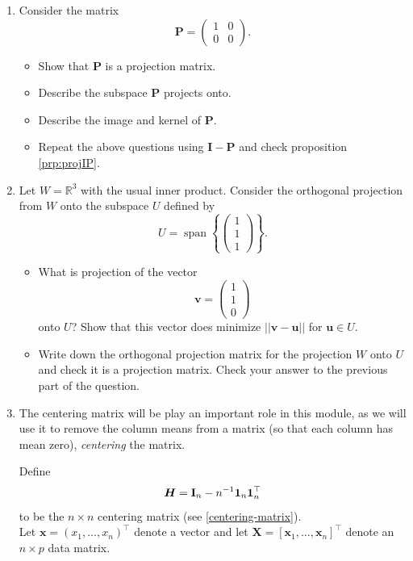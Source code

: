 \documentclass[]{book}
\providecommand{\tightlist}{%
  \setlength{\itemsep}{0pt}\setlength{\parskip}{0pt}}
\theoremstyle{definition}
\theoremstyle{definition}
\theoremstyle{definition}
\theoremstyle{remark}
\begin{document}
\begin{enumerate}
\def\labelenumi{\arabic{enumi}.}
\setcounter{enumi}{5}
\item
  Consider the matrix \[\boldsymbol P=\left( \begin{array}{cc}1&0\\
  0&0\end{array}\right).\]

  \begin{itemize}
  \tightlist
  \item
    Show that \(\boldsymbol P\) is a projection matrix.
  \item
    Describe the subspace \(\boldsymbol P\) projects onto.
  \item
    Describe the image and kernel of \(\boldsymbol P\).
  \item
    Repeat the above questions using \(\mathbf I-\boldsymbol P\) and check proposition \ref{prp:projIP}.
  \end{itemize}
\item
  Let \(W=\mathbb{R}^3\) with the usual inner product.
  Consider the orthogonal projection from \(W\) onto the subspace \(U\) defined by
  \[U=\operatorname{span}\left\{\left(\begin{array}{c} 1\\1\\1\end{array}\right)\right\}.\]

  \begin{itemize}
  \tightlist
  \item
    What is projection of the vector \[\boldsymbol v=\left(\begin{array}{c} 1\\1\\0\end{array}\right)\]
    onto \(U\)? Show that this vector does minimize \(||\boldsymbol v-\boldsymbol u||\) for \(\boldsymbol u\in U\).
  \item
    Write down the orthogonal projection matrix for the projection \(W\) onto \(U\) and check it is a projection matrix. Check your answer to the previous part of the question.
  \end{itemize}
\item
  The centering matrix will be play an important role in this module, as we will use it to remove the column means from a matrix (so that each column has mean zero), \emph{centering} the matrix.

  Define \[\boldsymbol H=\mathbf I_n - n^{-1}{\bf 1}_n {\bf 1}_n^\top\] to be the \(n \times n\) centering matrix (see \ref{centering-matrix}).\\
  Let \(\boldsymbol x=(x_1, \ldots , x_n)^\top\) denote a vector and let \(\boldsymbol X=[\boldsymbol x_1 ,\ldots , \boldsymbol x_n]^\top\) denote an \(n \times p\) data matrix.


\end{enumerate}
\end{document}
